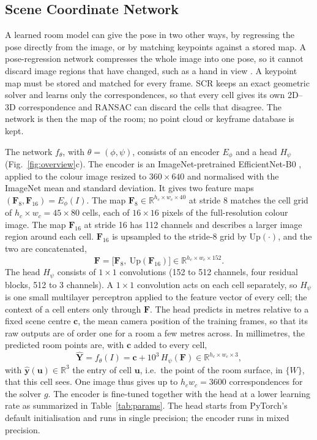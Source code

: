 \documentclass[9pt,shortpaper,twoside,web]{ieeecolor2}
\begin{document}
\subsection{Scene Coordinate Network}
\label{sec:network}
A learned room model can give the pose in two other ways, by regressing the pose directly from the image, or by matching keypoints against a stored map. A pose-regression network compresses the whole image into one pose, so it cannot discard image regions that have changed, such as a hand in view \cite{sattler2019}. A keypoint map must be stored and matched for every frame. SCR keeps an exact geometric solver and learns only the correspondences, so that every cell gives its own 2D--3D correspondence and RANSAC can discard the cells that disagree. The network is then the map of the room; no point cloud or keyframe database is kept.

The network $f_\theta$, with $\theta=(\phi,\psi)$, consists of an encoder $E_\phi$ and a head $H_\psi$ (Fig.~\ref{fig:overview}c). The encoder is an ImageNet-pretrained EfficientNet-B0 \cite{tan2019efficientnet}, applied to the colour image resized to $360\times640$ and normalised with the ImageNet mean and standard deviation. It gives two feature maps $(\mathbf{F}_8,\mathbf{F}_{16})=E_\phi(I)$. The map $\mathbf{F}_8\in\mathbb{R}^{h_c\times w_c\times40}$ at stride 8 matches the cell grid of $h_c\times w_c=45\times80$ cells, each of $16\times16$ pixels of the full-resolution colour image. The map $\mathbf{F}_{16}$ at stride 16 has 112 channels and describes a larger image region around each cell. $\mathbf{F}_{16}$ is upsampled to the stride-8 grid by $\mathrm{Up}(\cdot)$, and the two are concatenated,
\begin{equation}
  \mathbf{F}=\big[\mathbf{F}_8,\ \mathrm{Up}(\mathbf{F}_{16})\big]\in\mathbb{R}^{h_c\times w_c\times152}.
  \label{eq:features}
\end{equation}
The head $H_\psi$ consists of $1\times1$ convolutions (152 to 512 channels, four residual blocks, 512 to 3 channels). A $1\times1$ convolution acts on each cell separately, so $H_\psi$ is one small multilayer perceptron applied to the feature vector of every cell; the context of a cell enters only through $\mathbf{F}$. The head predicts in metres relative to a fixed scene centre $\mathbf{c}$, the mean camera position of the training frames, so that its raw outputs are of order one for a room a few metres across. In millimetres, the predicted room points are, with $\mathbf{c}$ added to every cell,
\begin{equation}
  \hat{\mathbf{Y}}=f_\theta(I)=\mathbf{c}+10^{3}\,H_\psi(\mathbf{F})\in\mathbb{R}^{h_c\times w_c\times3},
  \label{eq:network}
\end{equation}
with $\hat{\mathbf{y}}(\mathbf{u})\in\mathbb{R}^3$ the entry of cell $\mathbf{u}$, i.e.\ the point of the room surface, in $\{W\}$, that this cell sees. One image thus gives up to $h_cw_c=3600$ correspondences for the solver $g$. The encoder is fine-tuned together with the head at a lower learning rate as summarized in Table~\ref{tab:params}. The head starts from PyTorch's default initialisation and runs in single precision; the encoder runs in mixed precision.
\end{document}
